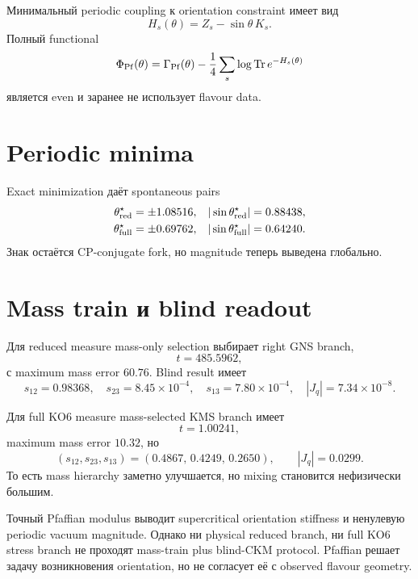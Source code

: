 Минимальный periodic coupling к orientation constraint имеет вид
\begin{equation}
 H_s(\theta)=Z_s-\sin\theta\,K_s.
\end{equation}
Полный functional
\begin{equation}
 \Phi_{\rm Pf}(\theta)=\Gamma_{\rm Pf}(\theta)
 -\frac14\sum_s\log\operatorname{Tr} e^{-H_s(\theta)}
\end{equation}
является even и заранее не использует flavour data.

\section{Periodic minima}

Exact minimization даёт spontaneous pairs
\begin{align}
 \theta_{\rm red}^\star&=\pm1.08516,
 &|\sin\theta_{\rm red}^\star|&=0.88438,\\
 \theta_{\rm full}^\star&=\pm0.69762,
 &|\sin\theta_{\rm full}^\star|&=0.64240.
\end{align}
Знак остаётся CP-conjugate fork, но magnitude теперь выведена глобально.

\section{Mass train и blind readout}

Для reduced measure mass-only selection выбирает right GNS branch,
\begin{equation}
 t=485.5962,
\end{equation}
с maximum mass error \(60.76\). Blind result имеет
\begin{equation}
 s_{12}=0.98368,
 \quad s_{23}=8.45\times10^{-4},
 \quad s_{13}=7.80\times10^{-4},
 \quad |J_q|=7.34\times10^{-8}.
\end{equation}

Для full KO6 measure mass-selected KMS branch имеет
\begin{equation}
 t=1.00241,
\end{equation}
maximum mass error \(10.32\), но
\begin{equation}
 (s_{12},s_{23},s_{13})=(0.4867,\,0.4249,\,0.2650),
 \qquad |J_q|=0.0299.
\end{equation}
То есть mass hierarchy заметно улучшается, но mixing становится
нефизически большим.

\begin{theorem}
Точный Pfaffian modulus выводит supercritical orientation stiffness и
ненулевую periodic vacuum magnitude. Однако ни physical reduced branch, ни
full KO6 stress branch не проходят mass-train plus blind-CKM protocol.
Pfaffian решает задачу возникновения orientation, но не согласует её с
observed flavour geometry.
\end{theorem}

